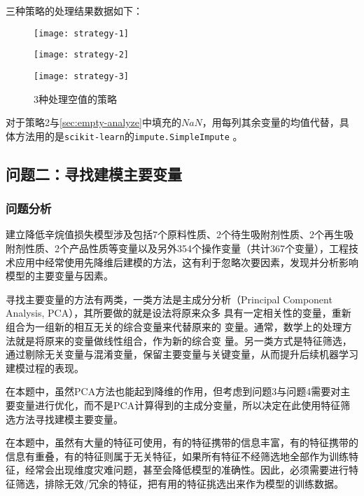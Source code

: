 \documentclass[bwprint]{gmcmthesis}
\begin{document}
三种策略的处理结果数据如下：






\begin{figure}[htb]
	\centering
	\begin{minipage}[c]{0.4\textwidth}
		\centering
		\texttt{[image: strategy-1]}
	\end{minipage}
	\begin{minipage}[c]{0.4\textheight}
		\centering
		\texttt{[image: strategy-2]}
	\end{minipage}
	\begin{minipage}[c]{0.4\textwidth}
		\centering
		\texttt{[image: strategy-3]}
	\end{minipage}
	\caption{3种处理空值的策略}
\end{figure}

对于策略2与\ref{sec:empty-analyze}中填充的$NaN$，用每列其余变量的均值代替，具体方法用的是\texttt{scikit-learn}的\texttt{impute.SimpleImpute} 。

\FloatBarrier
\subsection{问题二：寻找建模主要变量}
\FloatBarrier
\subsubsection{问题分析}

建立降低辛烷值损失模型涉及包括7个原料性质、2个待生吸附剂性质、2个再生吸附剂性质、2个产品性质等变量以及另外354个操作变量（共计367个变量），工程技术应用中经常使用先降维后建模的方法，这有利于忽略次要因素，发现并分析影响模型的主要变量与因素。

寻找主要变量的方法有两类，一类方法是主成分分析（Principal Component Analysis, PCA），其所要做的就是设法将原来众多
具有一定相关性的变量，重新组合为一组新的相互无关的综合变量来代替原来的
变量。通常，数学上的处理方法就是将原来的变量做线性组合，作为新的综合变
量。另一类方式是特征筛选，通过剔除无关变量与混淆变量，保留主要变量与关键变量，从而提升后续机器学习建模过程的表现。

在本题中，虽然PCA方法也能起到降维的作用，但考虑到问题3与问题4需要对主要变量进行优化，而不是PCA计算得到的主成分变量，所以决定在此使用特征筛选方法寻找建模主要变量。

在本题中，虽然有大量的特征可使用，有的特征携带的信息丰富，有的特征携带的信息有重叠，有的特征则属于无关特征，如果所有特征不经筛选地全部作为训练特征，经常会出现维度灾难问题，甚至会降低模型的准确性。因此，必须需要进行特征筛选，排除无效/冗余的特征，把有用的特征挑选出来作为模型的训练数据。
\end{document}
